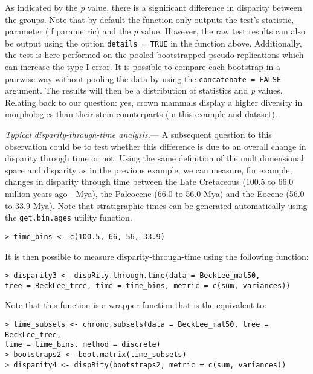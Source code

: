 \documentclass[12pt,letterpaper]{article}
\renewcommand{\subsubsection}[1]{%
\vspace{2ex}
\noindent
\textit{#1.}---}
\begin{document}
\bigskip
As indicated by the \textit{p} value, there is a significant difference in disparity between the groups.
Note that by default the function only outputs the test's statistic, parameter (if parametric) and the \textit{p} value.
However, the raw test results can also be output using the option \texttt{details = TRUE} in the function above.
Additionally, the test is here performed on the pooled bootstrapped pseudo-replications which can increase the type I error.
It is possible to compare each bootstrap in a pairwise way without pooling the data by using the \texttt{concatenate = FALSE} argument.
The results will then be a distribution of statistics and \textit{p} values.
Relating back to our question: yes, crown mammals display a higher diversity in morphologies than their stem counterparts (in this example and dataset).

\subsubsection{Typical disparity-through-time analysis}
A subsequent question to this observation could be to test whether this difference is due to an overall change in disparity through time or not.
Using the same definition of the multidimensional space and disparity as in the previous example, we can measure, for example, changes in disparity through time between the Late Cretaceous (100.5 to 66.0 million years ago - Mya), the Paleocene (66.0 to 56.0 Mya) and the Eocene (56.0 to 33.9 Mya).
Note that stratigraphic times can be generated automatically using the \texttt{get.bin.ages} utility function.

\noindent
\texttt{> time\_bins <- c(100.5, 66, 56, 33.9)}

It is then possible to measure disparity-through-time using the following function:

\noindent
\texttt{> disparity3 <- dispRity.through.time(data = BeckLee\_mat50,}\\
\texttt{tree = BeckLee\_tree, time = time\_bins, metric = c(sum, variances))}

\noindent Note that this function is a wrapper function that is the equivalent to:

\noindent \texttt{> time\_subsets <- chrono.subsets(data = BeckLee\_mat50, tree = BeckLee\_tree,}\\ \texttt{time = time\_bins, method = \textquotedbl discrete\textquotedbl)}\\
\noindent \texttt{> bootstraps2 <- boot.matrix(time\_subsets)}\\
\noindent \texttt{> disparity4 <- dispRity(bootstraps2, metric = c(sum, variances))}\\
\end{document}
